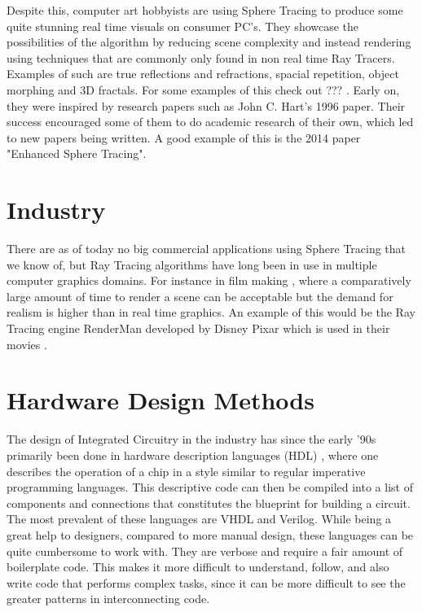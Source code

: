		Despite this, computer art hobbyists are using Sphere Tracing to produce
		some quite stunning real time visuals on consumer PC's. They showcase 
		the possibilities of the algorithm by reducing scene complexity and 
		instead rendering using techniques that are commonly only found in non 
		real time Ray Tracers. Examples of such are true reflections and 
		refractions, spacial repetition, object morphing and 3D fractals. 
		For some examples of this check out ???  \cite{InigoQuilez}.
		Early on, they were inspired by research papers such as John C. Hart's 
		1996 paper\cite{Hart1996}. Their success encouraged some of them to do 
		academic research of their own, which led to new papers being written. A 
		good example of this is the 2014 paper "Enhanced Sphere 
		Tracing"\cite{Korndorfer2014}.

		\section{ Industry }		
		There are as of today no big commercial applications using Sphere
		Tracing that we know of, but Ray Tracing algorithms have long been in 
		use in multiple computer graphics domains. For instance in film making 
		\cite{TODO}, where a comparatively large amount of time to render a 
		scene can be acceptable but the demand for realism is higher than in 
		real time graphics. An example of this would be the Ray Tracing engine 
		RenderMan developed by Disney Pixar which is used in their movies \cite{TODO}.
	
	\section{ Hardware Design Methods } 
	
		The design of Integrated Circuitry in the industry has since the early
		'90s primarily been done in hardware description languages (HDL)
		\cite{Chen2012}, where one describes the operation of a chip in a style
		similar to regular imperative programming languages. This descriptive
		code can then be compiled into a list of components and connections
		that constitutes the blueprint for building a circuit. The most
		prevalent of these languages are VHDL and Verilog\cite{TODO}. While
		being a great help to designers, compared to more manual design, these
		languages can be quite cumbersome to work with. They are verbose and 
		require a fair amount of boilerplate code. This makes it more difficult
		to understand, follow, and also write code that performs complex tasks, 
		since it can be more difficult to see the greater patterns in 
		interconnecting code.
		
